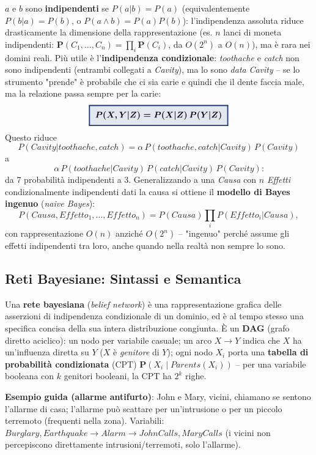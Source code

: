 \documentclass[a4paper,11pt]{article}
\newcommand{\keyeq}[1]{{\setlength{\fboxsep}{6pt}\setlength{\fboxrule}{1.3pt}\fcolorbox{iablue}{iablue!12}{\boldmath$\displaystyle #1$}}}
\begin{document}
$a$ e $b$ sono \textbf{indipendenti} se $P(a|b){=}P(a)$ (equivalentemente $P(b|a){=}P(b)$, o $P(a\wedge b){=}P(a)P(b)$): l'indipendenza assoluta riduce drasticamente la dimensione della rappresentazione (es. $n$ lanci di moneta indipendenti: $\mathbf{P}(C_1,\ldots,C_n)=\prod_i\mathbf{P}(C_i)$, da $O(2^n)$ a $O(n)$), ma è rara nei domini reali. Più utile è l'\textbf{indipendenza condizionale}: \emph{toothache} e \emph{catch} non sono indipendenti (entrambi collegati a \emph{Cavity}), ma lo sono \emph{data} \emph{Cavity} -- se lo strumento "prende" è probabile che ci sia carie e quindi che il dente faccia male, ma la relazione passa sempre per la carie:
\[
\keyeq{P(X,Y|Z) = P(X|Z)\,P(Y|Z)}
\]
Questo riduce
\[
P(Cavity|toothache,catch)=\alpha\,P(toothache,catch|Cavity)\,P(Cavity)
\]
a
\[
\alpha\,P(toothache|Cavity)\,P(catch|Cavity)\,P(Cavity)\text{:}
\]
da 7 probabilità indipendenti a 3. Generalizzando a una \emph{Causa} con $n$ \emph{Effetti} condizionalmente indipendenti dati la causa si ottiene il \textbf{modello di Bayes ingenuo} (\emph{naive Bayes}):
\[
P(Causa,Effetto_1,\ldots,Effetto_n) = P(Causa)\prod_i P(Effetto_i|Causa),
\]
con rappresentazione $O(n)$ anziché $O(2^n)$ -- "ingenuo" perché assume gli effetti indipendenti tra loro, anche quando nella realtà non sempre lo sono.

\subsection{Reti Bayesiane: Sintassi e Semantica}

Una \textbf{rete bayesiana} (\emph{belief network}) è una rappresentazione grafica delle asserzioni di indipendenza condizionale di un dominio, ed è al tempo stesso una specifica concisa della sua intera distribuzione congiunta. È un \textbf{DAG} (grafo diretto aciclico): un nodo per variabile casuale; un arco $X\to Y$ indica che $X$ ha un'influenza diretta su $Y$ ($X$ è \emph{genitore} di $Y$); ogni nodo $X_i$ porta una \textbf{tabella di probabilità condizionata} (CPT) $\mathbf{P}(X_i\mid Parents(X_i))$ -- per una variabile booleana con $k$ genitori booleani, la CPT ha $2^k$ righe.

\textbf{Esempio guida (allarme antifurto)}: John e Mary, vicini, chiamano se sentono l'allarme di casa; l'allarme può scattare per un'intrusione o per un piccolo terremoto (frequenti nella zona). Variabili: $Burglary,Earthquake\to Alarm\to JohnCalls,MaryCalls$ (i vicini non percepiscono direttamente intrusioni/terremoti, solo l'allarme).
\end{document}

